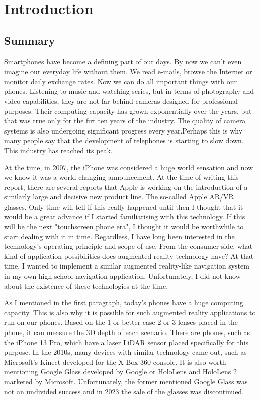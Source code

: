 \documentclass[a4paper,oneside]{article}
\begin{document}
\section{Introduction}
\label{sec:kornyezet}
\subsection{Summary}
\label{sec:bevezeto}


Smartphones have become a defining part of our days. By now we can't even imagine our everyday life without them. We read e-mails, browse the Internet or monitor daily exchange rates. Now we can do all important things with our phones. Listening to music and watching series, but in terms of photography and video capabilities, they are not far behind cameras designed for professional purposes. Their computing capacity has grown exponentially over the years, but that was true only for the firt ten years of the industry. The quality of camera systems is also undergoing significant progress every year.Perhaps this is why many people say that the development of telephones is starting to slow down. This industry has reached its peak.

At the time, in 2007, the iPhone was considered a huge world sensation and now we know it was a world-changing announcement. At the time of writing this report, there are several reports that Apple is working on the introduction of a similarly large and decisive new product line. The so-called Apple AR/VR glasses. Only time will tell if this really happened until then I thought that it would be a great advance if I started familiarising with this technology. If this will be the next "touchscreen phone era", I thought it would be worthwhile to start dealing with it in time. Regardless, I have long been interested in the technology's operating principle and scope of use. From the consumer side, what kind of application possibilities does augmented reality technology have? At that time, I wanted to implement a similar augmented reality-like navigation system in my own high school navigation application. Unfortunately, I did not know about the existence of these technologies at the time.

As I mentioned in the first paragraph, today's phones have a huge computing capacity. This is also why it is possible for such augmented reality applications to run on our phones. Based on the 1 or better case 2 or 3 lenses placed in the phone, it can measure the 3D depth of each scenario. There are phones, such as the iPhone 13 Pro, which have a laser LiDAR sensor placed specifically for this purpose. In the 2010s, many devices with similar technology came out, such as Microsoft's Kinect developed for the X-Box 360 console. It is also worth mentioning Google Glass developed by Google or HoloLens and HoloLens 2 marketed by Microsoft. Unfortunately, the former mentioned Google Glass was not an undivided success and in 2023 the sale of the glasses was discontinued.
\end{document}
